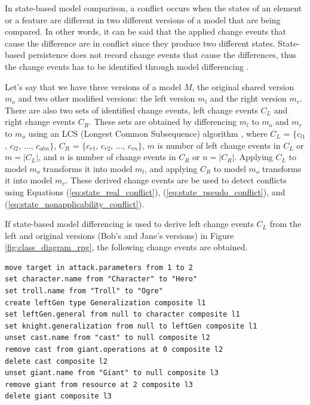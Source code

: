In state-based model comparison, a conflict occurs when the states of an element or a feature are different in two different versions of a model that are being compared. In other words, it can be said that the applied change events that cause the difference are in conflict since they produce two different states. State-based persistence does not record change events that cause the differences, thus the change events has to be identified through model differencing \cite{emfcompare2018developer,yohannis2019efficient}. 

Let's say that we have three versions of a model $M$, the original shared version $m_{o}$ and two other modified versions: the left version $m_{l}$ and the right version $m_{r}$. There are also two sets of identified change events, left change events $C_{L}$ and right change events $C_{R}$. These sets are obtained by differencing $m_{l}$ to $m_{o}$ and $m_{r}$ to $m_{o}$ using an LCS (Longest Common Subsequence) algorithm \cite{emfcompare2018developer,DBLP:journals/algorithmica/Meyers86}, where $C_{L}$ = $\{c_{l1}$, $c_{l2}$, ..., $c_{olm}\}$, $C_{R}$ = $\{c_{r1}$, $c_{r2}$, ..., $c_{rn}\}$, $m$ is number of left change events in $C_{L}$ or $m = |C_{L}|$, and $n$ is number of change events in $C_{R}$ or $n = |C_{R}|$. Applying $C_{L}$ to model $m_{o}$ transforms it into model $m_{l}$, and applying $C_{R}$ to model $m_{o}$ transforms it into model $m_{r}$. These derived change events are be used to detect conflicts using Equations (\ref{eq:state_real_conflict}), (\ref{eq:state_pseudo_conflict}), and (\ref{eq:state_nonapplicability_conflict}).  

If state-based model differencing is used to derive left change events $C_{L}$ from the left and original versions (Bob's and Jane's versions) in Figure \ref{fig:class_diagram_rpg}, the following change events are obtained. 
\begin{lstlisting}[firstnumber=1,style=eol,caption={The derived, minimal change events to produce the left version (Bob's version) in Figure \ref{fig:class_diagram_left} from the original version (Jane's version).},label=lst:cbp_left_state]
move target in attack.parameters from 1 to 2
set character.name from "Character" to "Hero"
set troll.name from "Troll" to "Ogre"
create leftGen type Generalization composite l1
set leftGen.general from null to character composite l1
set knight.generalization from null to leftGen composite l1
unset cast.name from "cast" to null composite l2
remove cast from giant.operations at 0 composite l2
delete cast composite l2
unset giant.name from "Giant" to null composite l3
remove giant from resource at 2 composite l3
delete giant composite l3
\end{lstlisting}

